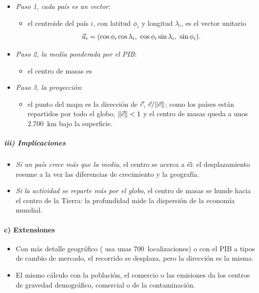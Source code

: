 \documentclass[11pt]{article}
\begin{document}
\begin{itemize}
\item \emph{Paso 1, cada país es un vector}:
  \begin{itemize}
  \item el centroide del país $i$, con latitud $\phi_i$ y longitud $\lambda_i$, es el vector unitario
  \[\vect{u}_i=(\cos\phi_i\cos\lambda_i,\ \cos\phi_i\sin\lambda_i,\ \sin\phi_i).\]
  \end{itemize}
\item \emph{Paso 2, la media ponderada por el PIB}:
  \begin{itemize}
  \item el centro de masas es
  \end{itemize}
\item \emph{Paso 3, la proyección}:
  \begin{itemize}
  \item el punto del mapa es la dirección de $\vec{c}$, $\vec{c}/\lVert\vec{c}\rVert$; como los países están repartidos por todo el globo, $\lVert\vec{c}\rVert<1$ y el centro de masas queda a unos 2.700~km bajo la superficie.
  \end{itemize}
\end{itemize}

\subparagraph{iii) Implicaciones}

\begin{itemize}
\item \emph{Si un país crece más que la media}, el centro se acerca a él: el desplazamiento resume a la vez las diferencias de crecimiento y la geografía.
\item \emph{Si la actividad se reparte más por el globo}, el centro de masas se hunde hacia el centro de la Tierra: la profundidad mide la dispersión de la economía mundial.
\end{itemize}

\paragraph{c) Extensiones}

\begin{itemize}
\item Con más detalle geográfico ( usa unas 700~localizaciones) o con el PIB a tipos de cambio de mercado, el recorrido se desplaza, pero la dirección es la misma.
\item El mismo cálculo con la población, el comercio o las emisiones da los centros de gravedad demográfico, comercial o de la contaminación.
\end{itemize}
\end{document}
